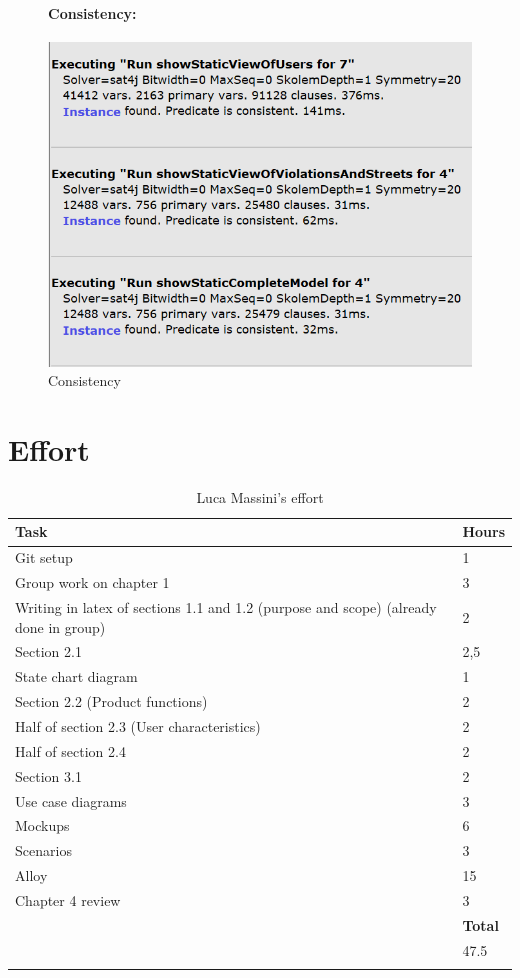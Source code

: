 \documentclass[titlepage]{article}
\begin{document}
\begin{figure}[h]
	\paragraph{Consistency:}
	\includegraphics[scale=1.168]{Alloy images/Consistency of the model.png}
	\centering
	\caption{Consistency}
\end{figure}
\FloatBarrier
\newpage
\section{Effort}
\begin{longtable}{| p{12 cm} | p{2 cm} |} 
		\hline
		{\bf Task} & {\bf Hours}\\
		\hline
		 Git setup & 1 \\
		 Group work on chapter 1 & 3 \\
		 Writing in latex of sections 1.1 and 1.2 (purpose and scope) (already done in group) & 2 \\
		 Section 2.1 & 2,5 \\
		 State chart diagram & 1 \\
		 Section 2.2 (Product functions) & 2 \\
		 Half of section 2.3 (User characteristics) & 2 \\
		 Half of section 2.4 & 2 \\
		 Section 3.1 & 2\\
		 Use case diagrams & 3 \\
		 Mockups & 6\\
		 Scenarios & 3 \\
		 Alloy & 15\\
		 Chapter 4 review & 3\\
		\hline
		&  {\bf Total} \\
		\hline
		&  47.5 \\
		\hline
		\caption{Luca Massini's effort}
	\end{longtable}
	
\end{document}
